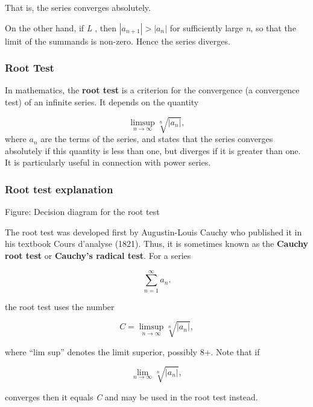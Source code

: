 That is, the series converges absolutely.


On the other hand, if \textit{L} , then $|a _{n+1}| > |a _{n}|$ for sufficiently large \textit{n}, so that the limit of the summands is non-zero. Hence the series diverges.


\subsubsection{Root Test}
\label{sss:root-9d7b}


In mathematics, the \textbf{root test} is a criterion for the convergence (a convergence test) of an infinite series. It depends on the quantity


\[
\limsup _{n\rightarrow\infty}\sqrt[n]{|a_n|},
\] where $a_n$ are the terms of the series, and states that the series converges absolutely if this quantity is less than one, but diverges if it is greater than one. It is particularly useful in connection with power series.


\subsubsection{Root test explanation}
\label{sss:root-bf3f}




Figure: Decision diagram for the root test


The root test was developed first by Augustin-Louis Cauchy who published it in his textbook Cours d'analyse (1821). Thus, it is sometimes known as the \textbf{Cauchy root test} or \textbf{Cauchy's radical test}. For a series


\[
\sum _{n=1}^\infty a_n.
\]


the root test uses the number


\[
C = \limsup _{n\rightarrow\infty}\sqrt[n]{|a_n|},
\]


where ``lim sup'' denotes the limit superior, possibly 8+. Note that if


\[
\lim _{n\rightarrow\infty}\sqrt[n]{|a_n|},
\]


converges then it equals \textit{C} and may be used in the root test instead.


